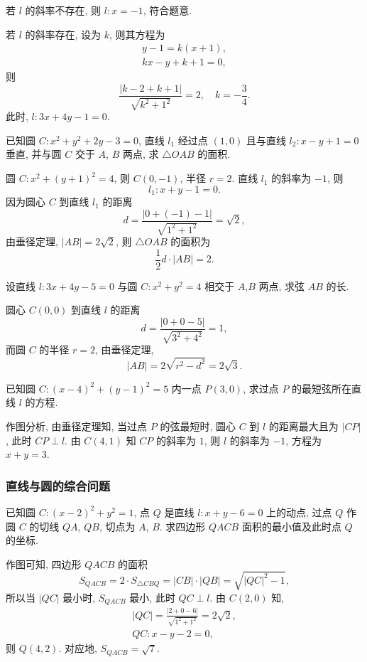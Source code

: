     若 $l$ 的斜率不存在, 则 $l\colon x=-1$, 符合题意.
    
    若 $l$ 的斜率存在, 设为 $k$, 则其方程为
    \[\begin{gathered}
        y-1= k(x+1),\\
        kx-y+k+1=0,
    \end{gathered}\]
    则
    \[\frac{|k-2+k+1|}{\sqrt{k^2+1^2}}= 2,\quad
    k= -\frac34.\]
    此时, $l\colon 3x+4y-1=0$.
\endsolution

\begin{example}
    已知圆 $C\colon x^2+y^2+ 2y-3= 0$, 直线 $l_1$ 经过点 $(1,0)$ 且与直线 $l_2\colon x-y+1=0$ 垂直, 并与圆 $C$ 交于 $A$, $B$ 两点, 求 $\triangle OAB$ 的面积.
\end{example}
\beginsolution
    圆 $C\colon x^2+ (y+1)^2= 4$, 则 $C(0,-1)$, 半径 $r=2$. 直线 $l_1$ 的斜率为 $-1$, 则
    \[l_1\colon x+y-1= 0.\]
    因为圆心 $C$ 到直线 $l_1$ 的距离
    \[d= \frac{|0+(-1)-1|}{\sqrt{1^2+1^2}}= \sqrt2,\]
    由垂径定理, $|AB|= 2\sqrt2$, 则 $\triangle OAB$ 的面积为
    \[\frac12 d\cdot |AB|= 2.\]
\endsolution

\lianxi
\begin{exercise}
    设直线 $l\colon 3x+4y-5=0$ 与圆 $C\colon x^2 +y^2 =4$ 相交于 $A$,$B$ 两点, 求弦 $AB$ 的长.
\end{exercise}
\beginsolution
    圆心 $C(0,0)$ 到直线 $l$ 的距离
    \[d= \frac{|0+0-5|}{\sqrt{3^2+4^2}}= 1,\]
    而圆 $C$ 的半径 $r=2$, 由垂径定理, 
    \[|AB|= 2\sqrt{r^2-d^2}= 2\sqrt3.\]
\endsolution

\begin{exercise}
    已知圆 $C\colon (x-4)^2 +(y-1)^2=5$ 内一点 $P(3, 0)$, 求过点 $P$ 的最短弦所在直线 $l$ 的方程.
\end{exercise}
\beginsolution
    作图分析, 由垂径定理知, 当过点 $P$ 的弦最短时, 圆心 $C$ 到 $l$ 的距离最大且为 $|CP|$, 此时 $CP\perp l$. 由 $C(4,1)$ 知 $CP$ 的斜率为 $1$, 则 $l$ 的斜率为 $-1$, 方程为 $x+y=3$.
\endsolution

\subsubsection{直线与圆的综合问题}
\begin{example}
    已知圆 $C\colon (x-2)^2 +y^2 =1$, 点 $Q$ 是直线 $l\colon x+y-6=0$ 上的动点, 过点 $Q$ 作圆 $C$ 的切线 $QA$, $QB$, 切点为 $A$, $B$. 求四边形 $QACB$ 面积的最小值及此时点 $Q$ 的坐标.
\end{example}
\beginsolution
    作图可知, 四边形 $QACB$ 的面积
    \[S_{QACB}= 2\cdot S_{\triangle CBQ}
        = |CB|\cdot |QB|= \sqrt{|QC|^2-1},\]
    所以当 $|QC|$ 最小时, $S_{QACB}$ 最小, 此时 $QC\perp l$. 由 $C(2,0)$ 知,
    \[\begin{gathered}
        |QC|= \frac{|2+0-6|}{\sqrt{1^2+1^2}}= 2\sqrt2,\\
        QC\colon x-y-2= 0,
    \end{gathered}\]
    则 $Q(4,2)$. 对应地, $S_{QACB}= \sqrt7$.
\endsolution


